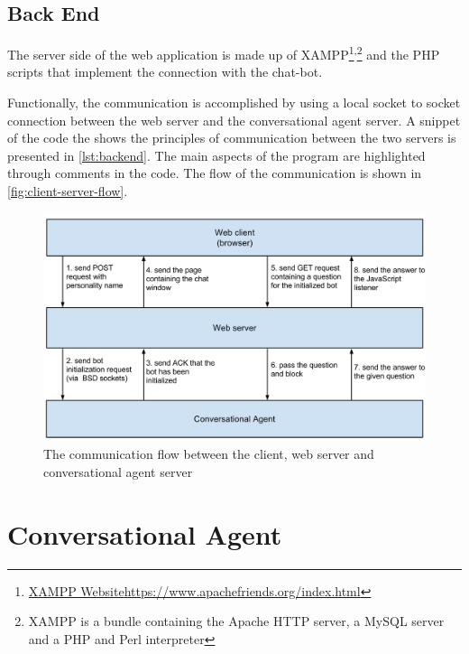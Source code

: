 \subsection{Back End}
\label{sub-sec:impl-wa-back-end}

The server side of the web application is made up of XAMPP\footnote{\href{https://www.apachefriends.org/index.html}{XAMPP Website}\url{https://www.apachefriends.org/index.html}}\textsuperscript{,}\footnote{XAMPP is a bundle containing the Apache HTTP server, a MySQL server and a PHP and Perl interpreter} and the PHP scripts that implement the connection with the chat-bot.

Functionally, the communication is accomplished by using a local socket to socket connection between the web server and the conversational agent server. A snippet of the code the shows the principles of communication between the two servers is presented in \autoref{lst:backend}. The main aspects of the program are highlighted through comments in the code. The flow of the communication is shown in \autoref{fig:client-server-flow}.



\begin{figure}[htb]
  \centering
  \captionsetup{justification=centering}
  \includegraphics[width=\textwidth]{src/img/client-server-flow.png}
  \caption{The communication flow between the client, web server and conversational agent server}
  \label{fig:client-server-flow}
\end{figure}


\section{Conversational Agent}
\label{sec:impl-conversational-agent}

